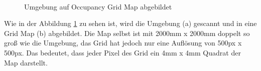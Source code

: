 \begin{figure}[H]
    \centering
     \\
    \caption{Umgebung auf Occupancy Grid Map abgebildet}
    \label{fig:gridMap}
\end{figure}

Wie in der Abbildung \ref{fig:gridMap} zu sehen ist, wird die Umgebung (a) gescannt und in eine Grid Map (b) abgebildet.
Die Map selbst ist mit 2000mm x 2000mm doppelt so groß wie die Umgebung, das Grid hat jedoch nur eine Auflösung von 500px x 500px.
Das bedeutet, dass jeder Pixel des Grid ein 4mm x 4mm Quadrat der Map darstellt.

